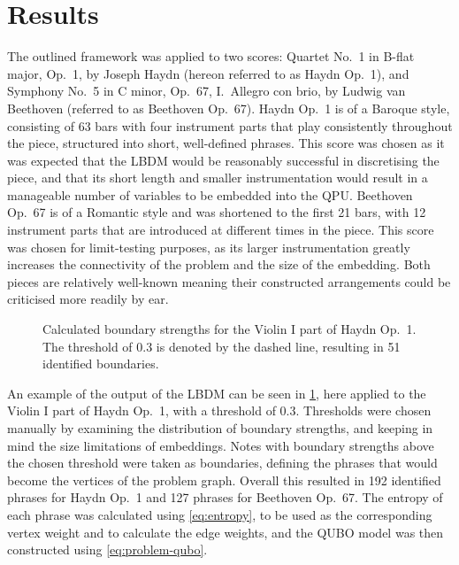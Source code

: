 \documentclass[12pt]{article}
\theoremstyle{definition}
\begin{document}
\section{Results}

The outlined framework was applied to two scores: Quartet No.\ 1 in B-flat major, Op.\ 1, by Joseph Haydn (hereon referred to as Haydn Op.\ 1), and Symphony No.\ 5 in C minor, Op.\ 67, I.\ Allegro con brio, by Ludwig van Beethoven (referred to as Beethoven Op.\ 67). Haydn Op.\ 1 is of a Baroque style, consisting of 63 bars with four instrument parts that play consistently throughout the piece, structured into short, well-defined phrases. This score was chosen as it was expected that the LBDM would be reasonably successful in discretising the piece, and that its short length and smaller instrumentation would result in a manageable number of variables to be embedded into the QPU. Beethoven Op.\ 67 is of a Romantic style and was shortened to the first 21 bars, with 12 instrument parts that are introduced at different times in the piece. This score was chosen for limit-testing purposes, as its larger instrumentation greatly increases the connectivity of the problem and the size of the embedding. Both pieces are relatively well-known meaning their constructed arrangements could be criticised more readily by ear.

\begin{figure}[h]
    \small
    
    \caption{Calculated boundary strengths for the Violin I part of Haydn Op.\ 1. The threshold of \num{0.3} is denoted by the dashed line, resulting in \num{51} identified boundaries.}
    \label{fig:phrase-extraction}
\end{figure}

An example of the output of the LBDM can be seen in \cref{fig:phrase-extraction}, here applied to the {Violin I} part of Haydn Op.\ 1, with a threshold of \num{0.3}. Thresholds were chosen manually by examining the distribution of boundary strengths, and keeping in mind the size limitations of embeddings. Notes with boundary strengths above the chosen threshold were taken as boundaries, defining the phrases that would become the vertices of the problem graph. Overall this resulted in \num{192} identified phrases for Haydn Op.\ 1 and \num{127} phrases for Beethoven Op.\ 67. The entropy of each phrase was calculated using \cref{eq:entropy}, to be used as the corresponding vertex weight and to calculate the edge weights, and the QUBO model was then constructed using \cref{eq:problem-qubo}.
\end{document}
